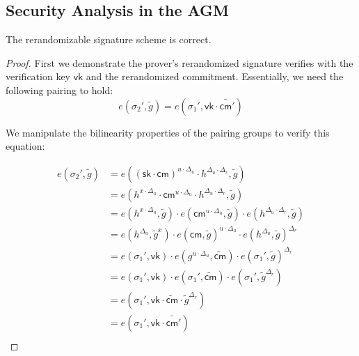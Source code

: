 \subsection{Security Analysis in the AGM}

\begin{theorem}
The rerandomizable signature scheme is correct.
\end{theorem}


\begin{proof}
First we demonstrate the prover's rerandomized signature verifies with the verification key $\mathsf{vk}$ and the rerandomized commitment. Essentially, we need the following pairing to hold:
\[
    e(\sigma_2', \tilde{g}) = e(\sigma_1', \mathsf{vk} \cdot \widetilde{\mathsf{cm}'})
\]

We manipulate the bilinearity properties of the pairing groups to verify this equation:
    
\begin{align*}
    e(\sigma_2', \tilde{g}) &= e((\mathsf{sk} \cdot \mathsf{cm})^{u \cdot \Delta_u} \cdot h^{\Delta_u \cdot \Delta_r}, \tilde{g}) \\
    &= e(h^{x \cdot \Delta_u} \cdot \mathsf{cm}^{u \cdot \Delta_u} \cdot h^{\Delta_u \cdot \Delta_r}, \tilde{g}) \\
    &= e(h^{x \cdot \Delta_u}, \tilde{g}) \cdot e(\mathsf{cm}^{u \cdot \Delta_u}, \tilde{g}) \cdot e(h^{\Delta_u \cdot \Delta_r}, \tilde{g}) \\
    &= e(h^{\Delta_u}, \tilde{g}^x) \cdot e(\mathsf{cm}, \tilde{g})^{u \cdot \Delta_u} \cdot e(h^{\Delta_u}, \tilde{g})^{\Delta_r} \\
    &= e(\sigma_1', \mathsf{vk}) \cdot e(g^{u \cdot \Delta_u}, \widetilde{\mathsf{cm}}) \cdot e(\sigma_1', \tilde{g})^{\Delta_r} \\
    &= e(\sigma_1', \mathsf{vk}) \cdot e(\sigma_1', \widetilde{\mathsf{cm}}) \cdot e(\sigma_1', \tilde{g}^{\Delta_r}) \\
    &= e(\sigma_1', \mathsf{vk} \cdot \widetilde{\mathsf{cm}} \cdot \tilde{g}^{\Delta_r}) \\
    &= e(\sigma_1', \mathsf{vk} \cdot \widetilde{\mathsf{cm}'}) \\
\end{align*}
\end{proof}

